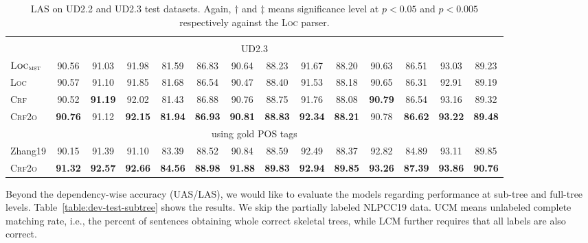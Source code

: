 \documentclass[11pt,a4paper]{article}
\begin{document}
\begin{table*}[tb]
\begin{tabular}{lccccccccccccc}
\hline
\\[-9pt]
\multicolumn{14}{c}{UD2.3} \\[1pt]
$\textsc{Loc}_{\textsc{mst}}$   &         90.56  &         91.03  &         91.98  &         81.59  & 86.83 &         90.64  & 88.23 &         91.67  &         88.20  &         90.63  & 86.51 & 93.03 &         89.23 \\
\textsc{Loc}                    &         90.57  &         91.10  &         91.85  &         81.68  & 86.54 &         90.47  & 88.40 &         91.53  &         88.18  &         90.65  & 86.31 & 92.91 &         89.19 \\
\textsc{Crf}   &         90.52  & \textbf{91.19} &         92.02  &         81.43  &         86.88\rlap{$^\dagger$}  &         90.76\rlap{$^\dagger$}  &         88.75  &         91.76  &         88.08  & \textbf{90.79} & 86.54 & 93.16\rlap{$^\ddagger$} &         89.32\rlap{$^\ddagger$} \\
\textsc{Crf2o} & \textbf{90.76} &         91.12  & \textbf{92.15}\rlap{$^\ddagger$} & \textbf{81.94} & \textbf{86.93}\rlap{$^\dagger$} & \textbf{90.81}\rlap{$^\ddagger$} &         \textbf{88.83}\rlap{$^\dagger$}  & \textbf{92.34}\rlap{$^\ddagger$} & \textbf{88.21}\rlap{$^\dagger$} & 90.78 & \textbf{86.62} & \textbf{93.22}\rlap{$^\ddagger$} & \textbf{89.48}\rlap{$^\ddagger$} \\
\multicolumn{14}{c}{using gold POS tags} \\[1pt]
Zhang19        & 90.15 & 91.39 & 91.10 & 83.39 & 88.52 & 90.84 & 88.59 & 92.49 & 88.37 & 92.82 & 84.89 & 93.11 & 89.85 \\
\textsc{Crf2o} & \textbf{91.32} & \textbf{92.57} & \textbf{92.66} & \textbf{84.56} & \textbf{88.98} & \textbf{91.88} & \textbf{89.83} & \textbf{92.94} & \textbf{89.85} & \textbf{93.26} & \textbf{87.39} & \textbf{93.86} & \textbf{90.76} \\
\bottomrule
\end{tabular}
\caption{LAS on UD2.2 and UD2.3 test datasets.
Again, $\dagger$ and $\ddagger$ means significance level at $p<0.05$ and $p<0.005$ respectively against the \textsc{Loc} parser. }
\label{table:ud2.3-test}
\end{table*}


 
Beyond the dependency-wise accuracy (UAS/LAS), we
would like to evaluate the models regarding performance at sub-tree and full-tree levels.
Table~\ref{table:dev-test-subtree} shows the results. We skip the partially labeled NLPCC19 data.
UCM means unlabeled complete matching rate, i.e., the percent of sentences obtaining whole correct skeletal trees, while
LCM further requires that all labels are also correct.
\end{document}
